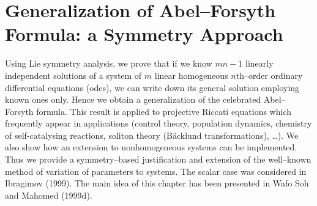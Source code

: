 
%

\chapter{Generalization of Abel--Forsyth Formula: a Symmetry  Approach}


Using Lie symmetry analysis, we prove that if we know $mn-1$ linearly
independent solutions of a system of $m$ linear homogeneous  $n$th--order
ordinary differential equations (odes), we can write down its general
solution employing known ones only. Hence we obtain a generalization
of the celebrated Abel--Forsyth formula. This result is applied to projective Riccati
equations which frequently appear in applications (control theory,
population dynamics,
chemistry of self-catalysing reactions, soliton theory
(B\"acklund transformations), \ldots). We also show how an extension to
nonhomogeneous systems can be implemented. Thus we provide a
symmetry--based justification and extension  of the well--known
method of variation of parameters to systems.
The scalar case was considered in Ibragimov (1999). The main idea of this
chapter has been presented in Wafo Soh and Mahomed (1999d).

